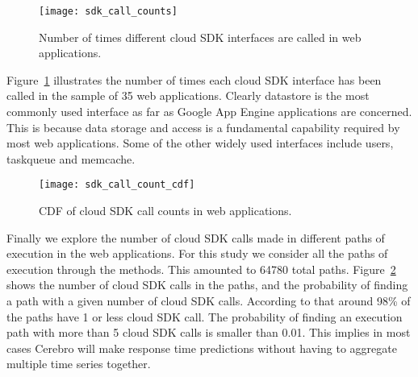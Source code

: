 \begin{figure}
\centering
\texttt{[image: sdk\_call\_counts]}
\caption{Number of times different cloud SDK interfaces are called in web applications.}
\label{fig:sdk_call_counts}
\end{figure}

Figure~\ref{fig:sdk_call_counts} illustrates the number of times each cloud SDK interface has been called in the sample of
35 web applications. Clearly datastore is the most commonly used interface as far as Google App Engine applications are 
concerned. This is because data storage and access is a fundamental capability required by most web applications. 
Some of the other widely used interfaces include users, taskqueue and memcache. 

\begin{figure}
\centering
\texttt{[image: sdk\_call\_count\_cdf]}
\caption{CDF of cloud SDK call counts in web applications.}
\label{fig:sdk_call_count_cdf}
\end{figure}

Finally we explore the number of cloud SDK calls made in different paths of execution in the web applications. For this study
we consider all the paths of execution through the methods. This amounted to 64780 total paths. Figure~\ref{fig:sdk_call_count_cdf}
shows the number of cloud SDK calls in the paths, and the probability of finding a path with a given number of cloud SDK calls.
According to that around 98\% of the paths have 1 or less cloud SDK call. The probability of finding an execution path with more than
5 cloud SDK calls is smaller than 0.01. This implies in most cases Cerebro will make response time predictions without having to 
aggregate multiple time series together.